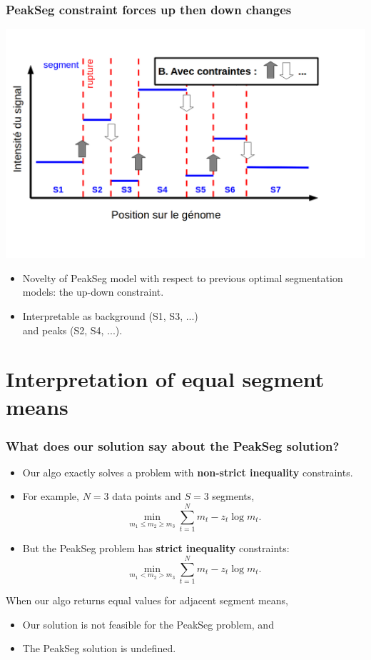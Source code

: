 \documentclass{beamer}
\begin{document}
\begin{frame}
  \frametitle{PeakSeg constraint forces up then down changes}
  \includegraphics[width=1\textwidth]{Seg_AvecC1.png}
  \vskip -1cm
  \begin{itemize}
  \item Novelty of PeakSeg model with respect to previous optimal
    segmentation models: the up-down constraint.
  \item Interpretable as background (S1, S3, ...)\\
    and peaks (S2, S4, ...).
  \end{itemize}
\end{frame}

\section*{Interpretation of equal segment means}

\begin{frame}
  \frametitle{What does our solution say about the PeakSeg solution?}
  \begin{itemize}
  \item Our algo exactly solves a problem with \textbf{non-strict
      inequality} constraints.
  \item For example, $N=3$ data points and $S=3$ segments,
    \begin{equation*}
      \min_{m_1\leq m_2\geq m_3}
      \sum_{t=1}^N m_t - z_t\log m_t.
    \end{equation*}
  \item But the PeakSeg problem has \textbf{strict inequality}
    constraints:
    \begin{equation*}
      \min_{m_1<m_2 >m_3}
      \sum_{t=1}^N m_t - z_t\log m_t.
    \end{equation*}
  \end{itemize}
  When our algo returns equal values for adjacent segment means,
  \begin{itemize}
  \item Our solution is not feasible for the PeakSeg problem, and
  \item The PeakSeg solution is undefined.
  \end{itemize}
\end{frame}
\end{document}
